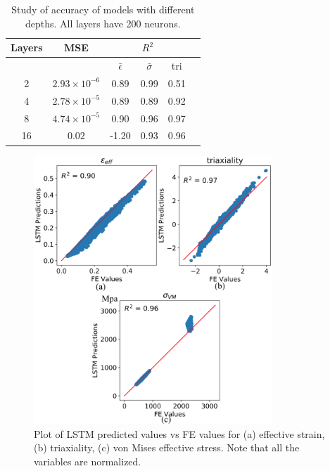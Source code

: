 \begin{table}
\begin{center}
\begin{tabular}{|c|c|c|c|c|c|}
\hline
Layers & MSE & \multicolumn{3}{c|}{$R^2$} \\
\hline
 & & ${\bar{\epsilon}}$ & $\bar{\sigma}$ & tri \\
\hline
2 & $2.93 \times 10^{-6}$ & 0.89 & 0.99 & 0.51\\
4 & $2.78 \times 10^{-5}$ & 0.89 & 0.89 & 0.92\\
8 & $4.74 \times 10^{-5}$ & 0.90 & 0.96 & 0.97\\
16 & $0.02$ & -1.20 & 0.93 & 0.96\\
\hline
\end{tabular}
\end{center}
\caption{Study of accuracy of models with different depths. All layers have 200 neurons.}
\label{tab:diff-lstm-table}
\end{table}
\begin{figure}[!h]
	\centering
	\includegraphics[width=0.8\textwidth]{Pictures/lstm-res/final-lstm-bitmap.png}
	\hspace{1mm}
	\caption{Plot of LSTM predicted values vs FE values for (a) effective strain, (b) triaxiality, (c) von Mises effective stress. Note that all the variables are normalized.} 
	\label{fig:exp_pred_lstm}
\end{figure}


